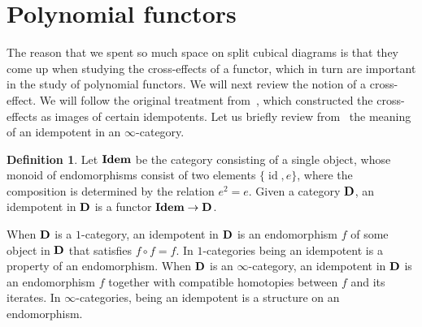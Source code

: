 \documentclass[psamsfonts]{amsart}
\theoremstyle{plain}
\theoremstyle{definition}
\newtheorem{defn}[thm]{Definition}
\theoremstyle{remark}
\newtheorem{rems}[thm]{Remarks}
\newcommand{\catname}[1]{{\normalfont\textbf{#1}}}
\newcommand{\idem}{\catname{Idem}}
\DeclareMathOperator{\id}{id}
\begin{document}
\section{Polynomial functors}\label{sec:polynomial}
The reason that we spent so much space on split cubical diagrams is that they come up when studying the cross-effects of a functor, which in turn are important in the study of polynomial functors. We will next review the notion of a cross-effect. We will follow the original treatment from~\cite{Eilenberg1954}, which constructed the cross-effects as images of certain idempotents. Let us briefly review from~\cite[Section 4.4.5]{LurieHTT} the meaning of an idempotent in an $\infty$-category.
\begin{defn}
Let $\idem$ be the category consisting of a single object, whose monoid of endomorphisms consist of two elements $\{\id, e\}$, where the composition is determined by the relation $e^2=e$. Given a category $\catname{D}$, an idempotent in $\catname{D}$ is a functor $\idem \to \catname{D}$.
\end{defn}
When $\catname{D}$ is a $1$-category, an idempotent in $\catname{D}$ is an endomorphism $f$ of some object in $\catname{D}$ that satisfies $f\circ f=f$. In $1$-categories being an idempotent is a property of an endomorphism. When $\catname{D}$ is an $\infty$-category, an idempotent in $\catname{D}$ is an endomorphism $f$ together with compatible homotopies between $f$ and its iterates. In $\infty$-categories, being an idempotent is a structure on an endomorphism.


\end{document}
